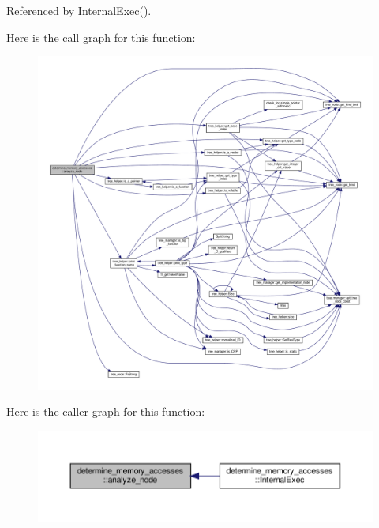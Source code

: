 Referenced by Internal\+Exec().

Here is the call graph for this function\+:
\nopagebreak
\begin{figure}[H]
\begin{center}
\leavevmode
\includegraphics[width=350pt]{dd/d8a/classdetermine__memory__accesses_a28b2c63625b32f4cb63221e0d8a51b96_cgraph}
\end{center}
\end{figure}
Here is the caller graph for this function\+:
\nopagebreak
\begin{figure}[H]
\begin{center}
\leavevmode
\includegraphics[width=350pt]{dd/d8a/classdetermine__memory__accesses_a28b2c63625b32f4cb63221e0d8a51b96_icgraph}
\end{center}
\end{figure}
\mbox{\label{classdetermine__memory__accesses_a00428eb833cbc6a1c65a23a184677851}} 

